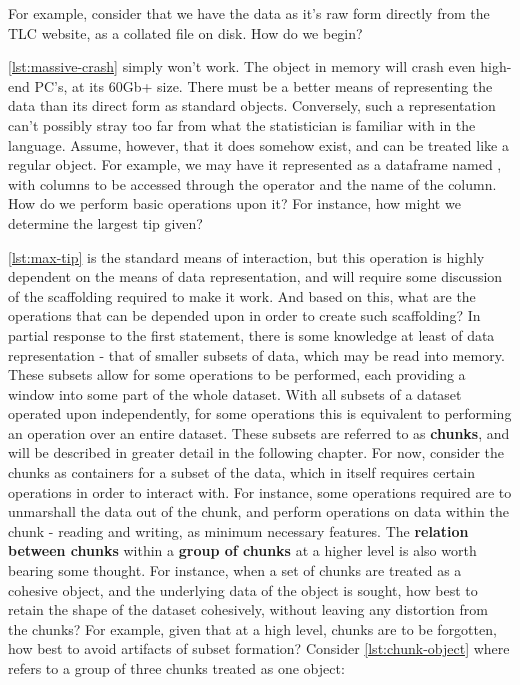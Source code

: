 For example, consider that we have the data as it's raw form directly
from the TLC website, as a collated  file on disk. How do we begin?


\cref{lst:massive-crash} simply won't work. The object in memory will crash even high-end
PC's, at its 60Gb+ size. There must be a better means of representing
the data than its direct form as standard \R{} objects. Conversely, such a
representation can't possibly stray too far from what the statistician
is familiar with in the language. Assume, however, that it does somehow
exist, and can be treated like a regular object. For example, we may
have it represented as a dataframe named , with
columns to be accessed through the  operator and the name of
the column. How do we perform basic operations upon it? For instance,
how might we determine the largest tip given?


\cref{lst:max-tip} is the standard means of interaction, but this operation is highly
dependent on the means of data representation, and will require some
discussion of the scaffolding required to make it work. And based on
this, what are the operations that can be depended upon in order to
create such scaffolding? In partial response to the first statement,
there is some knowledge at least of data representation - that of
smaller subsets of data, which may be read into memory. These subsets
allow for some operations to be performed, each providing a window into
some part of the whole dataset. With all subsets of a dataset operated
upon independently, for some operations this is equivalent to performing
an operation over an entire dataset. These subsets are referred to as
\textbf{chunks}, and will be described in greater detail in the
following chapter. For now, consider the chunks as containers for a
subset of the data, which in itself requires certain operations in order
to interact with. For instance, some operations required are to
unmarshall the data out of the chunk, and perform operations on data
within the chunk - reading and writing, as minimum necessary features.
The \textbf{relation between chunks} within a \textbf{group of chunks}
at a higher level is also worth bearing some thought. For instance, when
a set of chunks are treated as a cohesive object, and the underlying
data of the object is sought, how best to retain the shape of the
dataset cohesively, without leaving any distortion from the chunks? For
example, given that at a high level, chunks are to be forgotten, how
best to avoid artifacts of subset formation? Consider \cref{lst:chunk-object}
where  refers to a group of three chunks treated as one
object:

